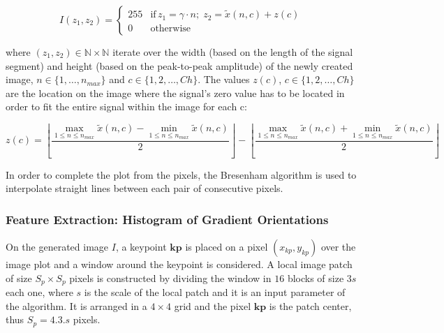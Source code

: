 \documentclass[utf8]{frontiersSCNS} %
\begin{document}
\begin{equation}
I(z_1,z_2) = \left\{ \begin{array}{rl}
255 & \text{if} \,  z_1 = \gamma \cdot n; \; z_2 = \tilde{x}(n,c) + z(c) \\
0   & \mbox{otherwise}
\end{array}\right.
\label{eq:images}
\end{equation}


\noindent where $ (z_1,z_2) \in \mathbb{N} \times \mathbb{N}$ iterate over the width (based on the length of the signal segment) and height (based on the peak-to-peak amplitude) of the newly created image,  $n \in \{1, \dots, n_{max}\}$ and $c \in \{1,2,\dots,Ch\}$.  The values $z(c)$, $c \in \{1,2,\dots,Ch\}$ are the location on the image where the signal's zero value has to be located in order to fit the entire signal within the image for each c:

\begin{equation}
z(c) = \left \lfloor{ \frac{\max_{1 \leq n\leq n_{max}} \tilde{x}(n,c)  - \min_{1 \leq n\leq n_{max}} \tilde{x}(n,c) }{2} }\right \rfloor -   \left \lfloor{ \frac{\max_{1 \leq n\leq n_{max}} \tilde{x}(n,c)  + \min_{1 \leq n\leq n_{max}} \tilde{x}(n,c)}{ 2} }\right \rfloor
\label{eq:zerolevel}
\end{equation}
  
In order to complete the plot from the pixels, the Bresenham \citep{Bresenham1965,Ramele2016} algorithm is used to interpolate straight lines between each pair of  consecutive pixels.


\subsubsection{Feature Extraction: Histogram of Gradient Orientations}
\label{SIFT}



On the generated image $I$, a keypoint $\mathbf{kp}$ is placed on a pixel $(x_{kp}, y_{kp})$ over the image plot and a window around the keypoint is considered. A local image patch of size $S_p \times S_p$ pixels is constructed by dividing the window in $16$ blocks of size $3s$ each one,  where $s$ is the scale of the local patch and it is an input parameter of the algorithm. It is arranged in a $4 \times 4$ grid and the pixel $ \mathbf{kp}$ is the patch center, thus $S_p = 4.3.s $ pixels. 
\end{document}
